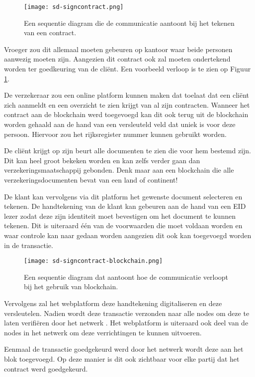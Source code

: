 \begin{figure}
	\texttt{[image: sd-signcontract.png]}
	\caption{Een sequentie diagram die de communicatie aantoont bij het tekenen van een contract. }
	\label{fig:signcontract}
\end{figure}

Vroeger zou dit allemaal moeten gebeuren op kantoor waar beide personen aanwezig moeten zijn. Aangezien dit contract ook zal moeten ondertekend worden ter goedkeuring van de cliënt. Een voorbeeld verloop is te zien op Figuur \ref{fig:signcontract}.

De verzekeraar zou een online platform kunnen maken dat toelaat dat een cliënt zich aanmeldt en een overzicht te zien krijgt van al zijn contracten. Wanneer het contract aan de blockchain werd toegevoegd kan dit ook terug uit de blockchain worden gehaald aan de hand van een versleuteld veld dat uniek is voor deze persoon. Hiervoor zou het rijksregister nummer kunnen gebruikt worden. 

De cliënt krijgt op zijn beurt alle documenten te zien die voor hem bestemd zijn. Dit kan heel groot bekeken worden en kan zelfs verder gaan dan verzekeringsmaatschappij gebonden. Denk maar aan een blockchain die alle verzekeringsdocumenten bevat van een land of continent!

De klant kan vervolgens via dit platform het gewenste document selecteren en tekenen. De handtekening van de klant kan gebeuren aan de hand van een EID lezer zodat deze zijn identiteit moet bevestigen om het document te kunnen tekenen. Dit is uiteraard één van de voorwaarden die moet voldaan worden en waar controle kan naar gedaan worden aangezien dit ook kan toegevoegd worden in de transactie. 

\begin{figure}
	\texttt{[image: sd-signcontract-blockchain.png]}
	\caption{Een sequentie diagram dat aantoont hoe de communicatie verloopt bij het gebruik van blockchain. }
	\label{fig:signcontract-blockchain}
\end{figure}

Vervolgens zal het webplatform deze handtekening digitaliseren en deze versleutelen. Nadien wordt deze transactie verzonden naar alle nodes om deze te laten verifiëren door het netwerk . Het webplatform is uiteraard ook deel van de nodes in het netwerk om deze verrichtingen te kunnen uitvoeren.

Eenmaal de transactie goedgekeurd werd door het netwerk wordt deze aan het blok toegevoegd. Op deze manier is dit ook zichtbaar voor elke partij dat het contract werd goedgekeurd. 

